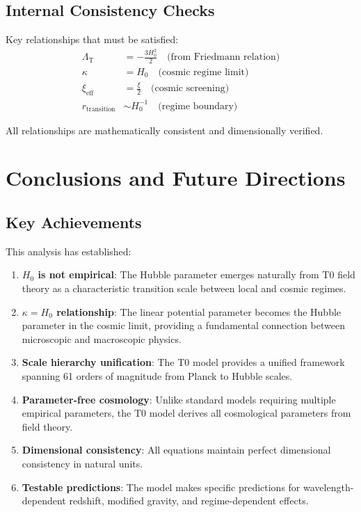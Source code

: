 \documentclass[12pt,a4paper]{article}
\newcommand{\LambdaT}{\Lambda_{\text{T}}}
\newcommand{\Hzero}{H_0}
\newcommand{\kappaparam}{\kappa}
\begin{document}
	\subsection{Internal Consistency Checks}
	\label{subsec:consistency_checks}
	
	Key relationships that must be satisfied:
	\begin{align}
		\LambdaT &= -\frac{3\Hzero^2}{2} \quad \text{(from Friedmann relation)} \\
		\kappaparam &= \Hzero \quad \text{(cosmic regime limit)} \\
		\xi_{\text{eff}} &= \frac{\xi}{2} \quad \text{(cosmic screening)} \\
		r_{\text{transition}} &\sim \Hzero^{-1} \quad \text{(regime boundary)}
	\end{align}
	
	All relationships are mathematically consistent and dimensionally verified.
	
	\section{Conclusions and Future Directions}
	\label{sec:conclusions}
	
	\subsection{Key Achievements}
	\label{subsec:key_achievements}
	
	This analysis has established:
	
	\begin{enumerate}
		\item \textbf{$H_0$ is not empirical}: The Hubble parameter emerges naturally from T0 field theory as a characteristic transition scale between local and cosmic regimes.
		
		\item \textbf{$\kappa = H_0$ relationship}: The linear potential parameter becomes the Hubble parameter in the cosmic limit, providing a fundamental connection between microscopic and macroscopic physics.
		
		\item \textbf{Scale hierarchy unification}: The T0 model provides a unified framework spanning 61 orders of magnitude from Planck to Hubble scales.
		
		\item \textbf{Parameter-free cosmology}: Unlike standard models requiring multiple empirical parameters, the T0 model derives all cosmological parameters from field theory.
		
		\item \textbf{Dimensional consistency}: All equations maintain perfect dimensional consistency in natural units.
		
		\item \textbf{Testable predictions}: The model makes specific predictions for wavelength-dependent redshift, modified gravity, and regime-dependent effects.
	\end{enumerate}
	
\end{document}
